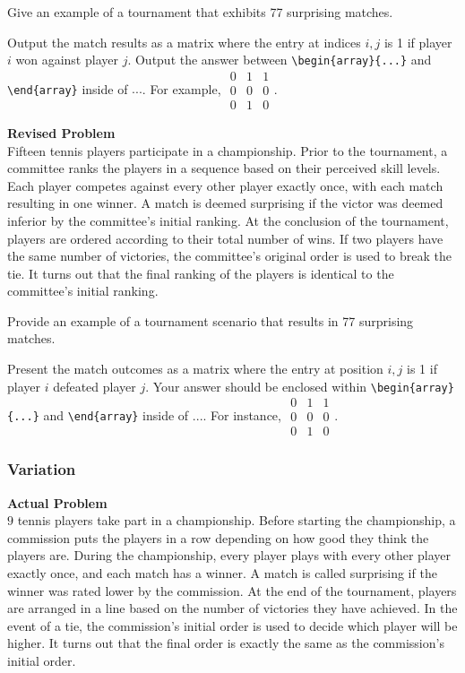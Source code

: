 Give an example of a tournament that exhibits 77 surprising matches.

Output the match results as a matrix where the entry at indices $i,j$ is 1 if player $i$ won against player $j$. Output the answer between \verb|\begin{array}{...}| and \verb|\end{array}| inside of $\boxed{...}$. For example, $\boxed{\begin{array}{ccc}0 & 1 & 1 \\ 0 & 0 & 0 \\ 0 & 1 & 0\end{array}}$.

\textbf{Revised Problem}\\
Fifteen tennis players participate in a championship. Prior to the tournament, a committee ranks the players in a sequence based on their perceived skill levels. Each player competes against every other player exactly once, with each match resulting in one winner. A match is deemed surprising if the victor was deemed inferior by the committee's initial ranking. At the conclusion of the tournament, players are ordered according to their total number of wins. If two players have the same number of victories, the committee's original order is used to break the tie. It turns out that the final ranking of the players is identical to the committee's initial ranking.

Provide an example of a tournament scenario that results in 77 surprising matches.

Present the match outcomes as a matrix where the entry at position $i,j$ is 1 if player $i$ defeated player $j$. Your answer should be enclosed within \verb|\begin{array}{...}| and \verb|\end{array}| inside of $\boxed{...}$. For instance, $\boxed{\begin{array}{ccc}0 & 1 & 1 \\ 0 & 0 & 0 \\ 0 & 1 & 0\end{array}}$.

\subsubsection{Variation}
\textbf{Actual Problem}\\
$9$ tennis players take part in a championship. Before starting the championship, a commission puts the players in a row depending on how good they think the players are. During the championship, every player plays with every other player exactly once, and each match has a winner. A match is called surprising if the winner was rated lower by the commission. At the end of the tournament, players are arranged in a line based on the number of victories they have achieved. In the event of a tie, the commission's initial order is used to decide which player will be higher.
It turns out that the final order is exactly the same as the commission's initial order. 

